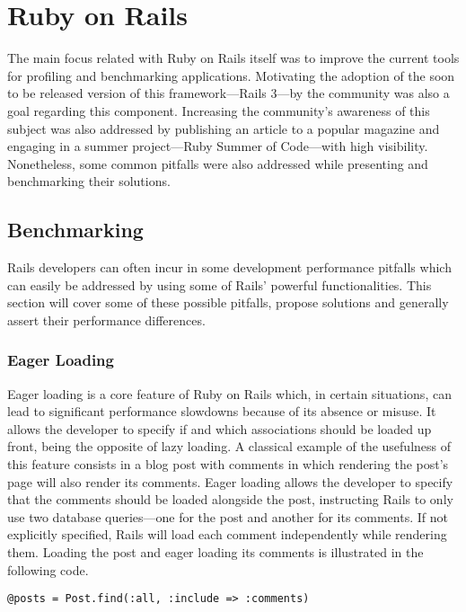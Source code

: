 \section{Ruby on Rails} %
\label{solution:sec:ruby_on_rails}
The main focus related with Ruby on Rails itself was to improve the current tools for profiling and benchmarking applications. Motivating the adoption of the soon to be released version of this framework---Rails 3---by the community was also a goal regarding this component. Increasing the community's awareness of this subject was also addressed by publishing an article to a popular magazine and engaging in a summer project---Ruby Summer of Code---with high visibility. Nonetheless, some common pitfalls were also addressed while presenting and benchmarking their solutions.

\begin{comment}
Create tools to improve Rails

Push the Rails community forward
\end{comment}

\subsection{Benchmarking}
Rails developers can often incur in some development performance pitfalls which can easily be addressed by using some of Rails' powerful functionalities. This section will cover some of these possible pitfalls, propose solutions and generally assert their performance differences.


\subsubsection{Eager Loading}
Eager loading is a core feature of Ruby on Rails which, in certain situations, can lead to significant performance slowdowns because of its absence or misuse. It allows the developer to specify if and which associations should be loaded up front, being the opposite of lazy loading. A classical example of the usefulness of this feature consists in a blog post with comments in which rendering the post's page will also render its comments. Eager loading allows the developer to specify that the comments should be loaded alongside the post, instructing Rails to only use two database queries---one for the post and another for its comments. If not explicitly specified, Rails will load each comment independently while rendering them. Loading the post and eager loading its comments is illustrated in the following code.
\begin{lstlisting}[xleftmargin=30pt,xrightmargin=30pt]
@posts = Post.find(:all, :include => :comments)
\end{lstlisting}

